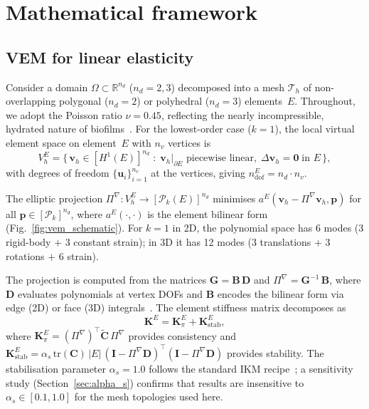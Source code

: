 \documentclass[smallextended]{svjour3}
\newcommand{\vect}[1]{\bm{#1}}
\newcommand{\mat}[1]{\mathbf{#1}}
\newcommand{\tr}{\mathrm{tr}}
\begin{document}
\section{Mathematical framework}
\label{sec:math}

\subsection{VEM for linear elasticity}
\label{sec:vem:lin}

Consider a domain $\Omega \subset \mathbb{R}^{n_d}$ ($n_d=2,3$)
decomposed into a mesh $\mathcal{T}_h$ of non-overlapping polygonal
($n_d{=}2$) or polyhedral ($n_d{=}3$) elements~$E$.
Throughout, we adopt the Poisson ratio $\nu = 0.45$, reflecting
the nearly incompressible, hydrated nature of
biofilms~\cite{Peterson2015,Stoodley1999}.
For the lowest-order case ($k{=}1$), the local virtual element space on
element~$E$ with $n_v$ vertices is
\begin{equation}
  V_h^E = \bigl\{\, \vect{v}_h \in [H^1(E)]^{n_d} \;:\;
    \vect{v}_h|_{\partial E} \text{ piecewise linear},\;
    \Delta \vect{v}_h = \vect{0} \;\text{in } E
  \,\bigr\},
  \label{eq:vem_space}
\end{equation}
with degrees of freedom $\{\vect{u}_i\}_{i=1}^{n_v}$ at the vertices,
giving $n_\mathrm{dof}^E = n_d \cdot n_v$.

The elliptic projection
$\Pi^\nabla : V_h^E \to [\mathcal{P}_k(E)]^{n_d}$
minimises $a^E(\vect{v}_h - \Pi^\nabla \vect{v}_h, \vect{p})$
for all $\vect{p} \in [\mathcal{P}_k]^{n_d}$,
where $a^E(\cdot,\cdot)$ is the element bilinear form
(Fig.~\ref{fig:vem_schematic}).
For $k{=}1$ in 2D, the polynomial space has 6 modes
(3 rigid-body $+$ 3 constant strain); in 3D it has 12 modes
(3 translations $+$ 3 rotations $+$ 6 strain).

The projection is computed from the matrices
$\mat{G} = \mat{B}\,\mat{D}$ and
$\Pi^\nabla = \mat{G}^{-1}\,\mat{B}$,
where $\mat{D}$ evaluates polynomials at vertex DOFs and
$\mat{B}$ encodes the bilinear form via edge (2D) or face (3D)
integrals~\cite{Sutton2017}.
The element stiffness matrix decomposes as
\begin{equation}
  \mat{K}^E = \mat{K}^E_\pi + \mat{K}^E_\mathrm{stab},
  \label{eq:K_decomp}
\end{equation}
where $\mat{K}^E_\pi = (\Pi^\nabla)^\top \tilde{\mat{C}}\, \Pi^\nabla$
provides consistency and
$\mat{K}^E_\mathrm{stab} = \alpha_s\,\tr(\mat{C})\,|E|\,
(\mat{I} - \Pi^\nabla\mat{D})^\top(\mat{I} - \Pi^\nabla\mat{D})$
provides stability.
The stabilisation parameter $\alpha_s = 1.0$ follows the standard
IKM recipe~\cite{Wriggers2019,BeiraodaVeiga2013}; a sensitivity study
(Section~\ref{sec:alpha_s}) confirms that results are insensitive to
$\alpha_s \in [0.1, 1.0]$ for the mesh topologies used here.
\end{document}
